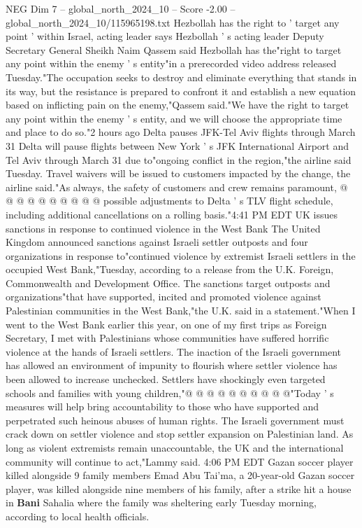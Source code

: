 \begin{textsample}{NEG Dim 7 – global\_north\_2024\_10 – Score -2.00 – global\_north\_2024\_10/115965198.txt}  \label{ex:f7_neg_356}
Hezbollah has the right to ' target any point ' within Israel, acting leader says Hezbollah ' s acting leader Deputy Secretary General Sheikh Naim Qassem said Hezbollah has the"right to target any point within the enemy ' s entity"in a prerecorded video address released Tuesday."The occupation seeks to destroy and eliminate everything that stands in its way, but the resistance is prepared to confront it and establish a new equation based on inflicting pain on the enemy,"Qassem said."We have the right to target any point within the enemy ' s entity, and we will choose the appropriate time and place to do so."2 hours ago Delta pauses JFK-Tel Aviv flights through March 31 Delta will pause flights between New York ' s JFK International Airport and Tel Aviv through March 31 due to"ongoing conflict in the region,"the airline said Tuesday.
Travel waivers will be issued to customers impacted by the change, the airline said."As always, the safety of customers and crew remains paramount, @ @ @ @ @ @ @ @ @ @ possible adjustments to Delta ' s TLV flight schedule, including additional cancellations on a rolling basis."4:41 PM EDT UK issues sanctions in response to continued violence in the West Bank The United Kingdom announced sanctions against Israeli settler outposts and four organizations in response to"continued violence by extremist Israeli settlers in the occupied West Bank,"Tuesday, according to a release from the U.K.
Foreign, Commonwealth and Development Office.
The sanctions target outposts and organizations"that have supported, incited and promoted violence against Palestinian communities in the West Bank,"the U.K. said in a statement."When I went to the West Bank earlier this year, on one of my first trips as Foreign Secretary, I met with Palestinians whose communities have suffered horrific violence at the hands of Israeli settlers.
The inaction of the Israeli government has allowed an environment of impunity to flourish where settler violence has been allowed to increase unchecked.
Settlers have shockingly even targeted schools and families with young children,"@ @ @ @ @ @ @ @ @ @"Today ' s measures will help bring accountability to those who have supported and perpetrated such heinous abuses of human rights.
The Israeli government must crack down on settler violence and stop settler expansion on Palestinian land.
As long as violent extremists remain unaccountable, the UK and the international community will continue to act,"Lammy said. 4:06 PM EDT Gazan soccer player killed alongside 9 family members Emad Abu Tai'ma, a 20-year-old Gazan soccer player, was killed alongside nine members of his family, after a strike hit a house in \textbf{Bani} Sahalia where the family was sheltering early Tuesday morning, according to local health officials.

\end{textsample}
